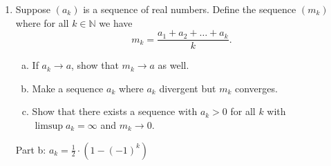 \documentclass{amsart}
\newtheorem{theorem}{Theorem}
\begin{document}
\begin{enumerate}[1.]
\begin{theorem}
\begin{proof}
    \end{proof}
\end{theorem}
\newpage
\item Suppose $(a_k)$ is a sequence of real numbers. Define the sequence $(m_k)$ where for all $k \in \mathbb{N}$ we have
\[ m_k= \frac{a_1+a_2+\dots+ a_k}{k}.\]
\begin{enumerate}[(a)]
\item If $a_k \to a$, show that $m_k\to a$ as well.
\item Make a sequence $a_k$ where $a_k$ divergent but $m_k$ converges.
\item Show that there exists a sequence with $a_k>0$ for all $k$ with $\limsup a_k=\infty$ and $m_k\to 0.$
\end{enumerate}
Part b: $a_k = \frac{1}{2} \cdot (1 - (-1)^k)$



\end{enumerate}
\end{document}
